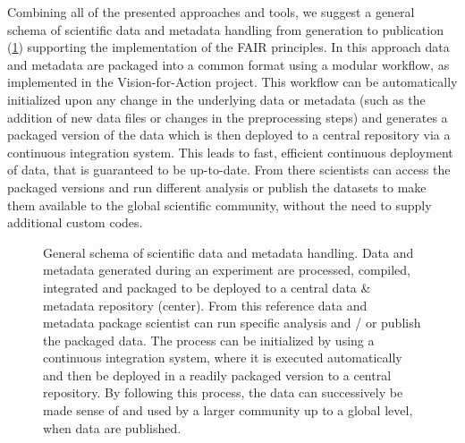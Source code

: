 Combining all of the presented approaches and tools, we suggest a general schema of scientific data and metadata handling from generation to publication (\cref{fig:disc_general_schema}) supporting the implementation of the FAIR principles. In this approach data and metadata are packaged into a common format using a modular workflow, as implemented in the Vision-for-Action project. This workflow can be automatically initialized upon any change in the underlying data or metadata (such as the addition of new data files or changes in the preprocessing steps) and generates a packaged version of the data which is then deployed to a central repository via a continuous integration system. This leads to fast, efficient continuous deployment of data, that is guaranteed to be up-to-date. From there scientists can access the packaged versions and run different analysis or publish the datasets to make them available to the global scientific community, without the need to supply additional custom codes.

\begin{figure}
 
 \caption[General schema of scientific data and metadata handling]{General schema of scientific data and metadata handling. Data and metadata generated during an experiment are processed, compiled, integrated and packaged to be deployed to a central data \& metadata repository (center). From this reference data and metadata package scientist can run specific analysis and / or publish the packaged data. The process can be initialized by using a continuous integration system, where it is executed automatically and then be deployed in a readily packaged version to a central repository. By following this process, the data can successively be made sense of and used by a larger community up to a global level, when data are published.}
 \label{fig:disc_general_schema}
\end{figure}

